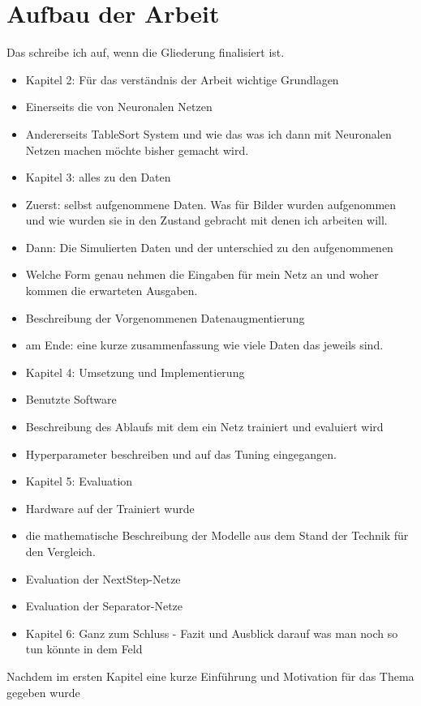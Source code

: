 \section{Aufbau der Arbeit}

Das schreibe ich auf, wenn die Gliederung finalisiert ist.

\begin{itemize}
    \item Kapitel 2: Für das verständnis der Arbeit wichtige Grundlagen
    \item Einerseits die von Neuronalen Netzen
    \item Andererseits TableSort System und wie das was ich dann mit Neuronalen Netzen machen möchte bisher gemacht wird.
    \item Kapitel 3: alles zu den Daten
    \item Zuerst: selbst aufgenommene Daten. Was für Bilder wurden aufgenommen und wie wurden sie in den Zustand gebracht mit denen ich arbeiten will.
    \item Dann: Die Simulierten Daten und der unterschied zu den aufgenommenen
    \item Welche Form genau nehmen die Eingaben für mein Netz an und woher kommen die erwarteten Ausgaben.
    \item Beschreibung der Vorgenommenen Datenaugmentierung
    \item am Ende: eine kurze zusammenfassung wie viele Daten das jeweils sind.
    \item Kapitel 4: Umsetzung und Implementierung
    \item Benutzte Software
    \item Beschreibung des Ablaufs mit dem ein Netz trainiert und evaluiert wird
    \item Hyperparameter beschreiben und auf das Tuning eingegangen.
    \item Kapitel 5: Evaluation
    \item Hardware auf der Trainiert wurde
    \item die mathematische Beschreibung der Modelle aus dem Stand der Technik für den Vergleich.
    \item Evaluation der NextStep-Netze
    \item Evaluation der Separator-Netze
    \item Kapitel 6: Ganz zum Schluss - Fazit und Ausblick darauf was man noch so tun könnte in dem Feld
\end{itemize}


Nachdem im ersten Kapitel eine kurze Einführung und Motivation für das Thema gegeben wurde



